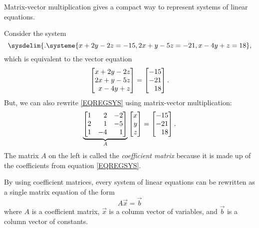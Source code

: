 Matrix-vector multiplication gives a compact way to represent systems of linear equations.

Consider the system
\begin{equation}
	\label{EQREGSYS}
	\sysdelim\{.
		\systeme{
			x+2y-2z=-15,
			2x+y-5z=-21,
			x-4y+z=18
		},
\end{equation}
which is equivalent to the vector equation
\[
	\mat{x+2y-2z\\
           2x+y-5z\\
	     x-4y+z}=\mat{-15\\-21\\18}.
\]
But, we can also rewrite \eqref{EQREGSYS} using matrix-vector multiplication:
\[
	\underbrace{\mat{1&2&-2\\2&1&-5\\1&-4&1}}_{A}\mat{x\\y\\z}=\mat{-15\\-21\\18}.
\]
The matrix $A$ on the left is called the \emph{coefficient matrix} because it
is made up of the coefficients from equation \eqref{EQREGSYS}.

By using coefficient matrices, every system of linear equations can be rewritten as a single matrix equation
of the form
\[
	A\vec x=\vec b
\]
where $A$ is a coefficient matrix, $\vec x$ is a column vector of variables, and $\vec b$ 
is a column vector of constants.

